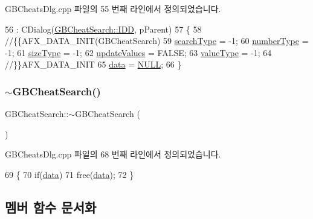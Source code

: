 G\+B\+Cheats\+Dlg.\+cpp 파일의 55 번째 라인에서 정의되었습니다.


\begin{DoxyCode}
56   : CDialog(\mbox{\hyperlink{class_g_b_cheat_search_a8a05654b6ab7a791118b280a11c2bee4a11fb6d777c08226582f9295e72a094c0}{GBCheatSearch::IDD}}, pParent)
57 \{
58   \textcolor{comment}{//\{\{AFX\_DATA\_INIT(GBCheatSearch)}
59   \mbox{\hyperlink{class_g_b_cheat_search_a35d0a28509b050fcb3608d6f9777bda7}{searchType}} = -1;
60   \mbox{\hyperlink{class_g_b_cheat_search_aff51de1046c650805a8b749aa8df9cad}{numberType}} = -1;
61   \mbox{\hyperlink{class_g_b_cheat_search_ad6db93445aa94c36d4d5275204e7ecb0}{sizeType}} = -1;
62   \mbox{\hyperlink{class_g_b_cheat_search_aa300097df0223fda71edea99324e9cb6}{updateValues}} = FALSE;
63   \mbox{\hyperlink{class_g_b_cheat_search_a86a4834163ee6a13a5bb8531a7c67c1d}{valueType}} = -1;
64   \textcolor{comment}{//\}\}AFX\_DATA\_INIT}
65   \mbox{\hyperlink{class_g_b_cheat_search_a3b53d05af5d79a51830df8d06256e1fc}{data}} = \mbox{\hyperlink{getopt1_8c_a070d2ce7b6bb7e5c05602aa8c308d0c4}{NULL}};
66 \}
\end{DoxyCode}
\mbox{\label{class_g_b_cheat_search_add90a762d632511054e57962eac4cbbb}} 
\subsubsection{\texorpdfstring{$\sim$\+G\+B\+Cheat\+Search()}{~GBCheatSearch()}}
{\footnotesize\ttfamily G\+B\+Cheat\+Search\+::$\sim$\+G\+B\+Cheat\+Search (\begin{DoxyParamCaption}{ }\end{DoxyParamCaption})}



G\+B\+Cheats\+Dlg.\+cpp 파일의 68 번째 라인에서 정의되었습니다.


\begin{DoxyCode}
69 \{
70   \textcolor{keywordflow}{if}(\mbox{\hyperlink{class_g_b_cheat_search_a3b53d05af5d79a51830df8d06256e1fc}{data}})
71     free(\mbox{\hyperlink{class_g_b_cheat_search_a3b53d05af5d79a51830df8d06256e1fc}{data}});
72 \}
\end{DoxyCode}


\subsection{멤버 함수 문서화}
\mbox{\label{class_g_b_cheat_search_a1765135b0200e93b3d8fd13c8c9c2ea0}} 
